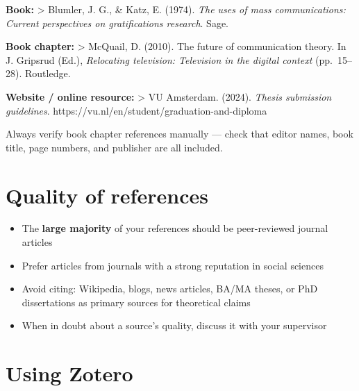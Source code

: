 \documentclass[
  11pt,
  a4paper,
]{scrbook}
\providecommand{\tightlist}{%
  \setlength{\itemsep}{0pt}\setlength{\parskip}{0pt}}\usepackage{longtable,booktabs,array}
\begin{document}
\textbf{Book:} \textgreater{} Blumler, J. G., \& Katz, E. (1974).
\emph{The uses of mass communications: Current perspectives on
gratifications research}. Sage.

\textbf{Book chapter:} \textgreater{} McQuail, D. (2010). The future of
communication theory. In J. Gripsrud (Ed.), \emph{Relocating television:
Television in the digital context} (pp.~15--28). Routledge.

\textbf{Website / online resource:} \textgreater{} VU Amsterdam. (2024).
\emph{Thesis submission guidelines}.
https://vu.nl/en/student/graduation-and-diploma

\begin{tcolorbox}[enhanced jigsaw, bottomrule=.15mm, opacityback=0, toprule=.15mm, colframe=quarto-callout-warning-color-frame, left=2mm, rightrule=.15mm, title=\textcolor{quarto-callout-warning-color}{\faExclamationTriangle}\hspace{0.5em}{Reference managers often produce incomplete book chapter references}, colbacktitle=quarto-callout-warning-color!10!white, bottomtitle=1mm, colback=white, breakable, toptitle=1mm, titlerule=0mm, leftrule=.75mm, arc=.35mm, opacitybacktitle=0.6, coltitle=black]

Always verify book chapter references manually --- check that editor
names, book title, page numbers, and publisher are all included.

\end{tcolorbox}

\section{Quality of references}\label{quality-of-references}

\begin{itemize}
\tightlist
\item
  The \textbf{large majority} of your references should be peer-reviewed
  journal articles
\item
  Prefer articles from journals with a strong reputation in social
  sciences
\item
  Avoid citing: Wikipedia, blogs, news articles, BA/MA theses, or PhD
  dissertations as primary sources for theoretical claims
\item
  When in doubt about a source's quality, discuss it with your
  supervisor
\end{itemize}

\section{Using Zotero}\label{using-zotero}
\end{document}
